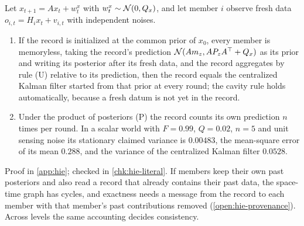 \begin{proposition}\label{prop:hie-record-filter}
Let $x_{t+1}=Ax_t+w^x_t$ with $w^x_t\sim\mathcal{N}(0,Q_x)$, and let member $i$ observe fresh data $o_{i,t}=H_ix_t+v_{i,t}$ with independent noises.
\begin{enumerate}
\item[(a)] If the record is initialized at the common prior of $x_0$, every member is memoryless, taking the record's prediction $\mathcal{N}(Am_z,AP_zA^\top+Q_x)$ as its prior and writing its posterior after its fresh data, and the record aggregates by rule (U) relative to its prediction, then the record equals the centralized Kalman filter started from that prior at every round; the cavity rule holds automatically, because a fresh datum is not yet in the record.
\item[(b)] Under the product of posteriors (P) the record counts its own prediction $n$ times per round. In a scalar world with $F=0.99$, $Q=0.02$, $n=5$ and unit sensing noise its stationary claimed variance is $0.00483$, the mean-square error of its mean $0.288$, and the variance of the centralized Kalman filter $0.0528$.
\end{enumerate}
\end{proposition}

Proof in \cref{app:hie}; checked in \cref{chk:hie-literal}. If members keep their own past posteriors and also read a record that already contains their past data, the space-time graph has cycles, and exactness needs a message from the record to each member with that member's past contributions removed (\cref{open:hie-provenance}). Across levels the same accounting decides consistency.

